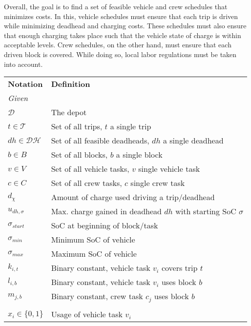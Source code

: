 \documentclass[]{article}
\begin{document}
Overall, the goal is to find a set of feasible vehicle and crew schedules that minimizes costs. In this, vehicle schedules must ensure that each trip is driven while minimizing deadhead and charging costs. These schedules must also ensure that enough charging takes place such that the vehicle state of charge is within acceptable levels. Crew schedules, on the other hand, must ensure that each driven block is covered. While doing so, local labor regulations must be taken into account.

\begin{table}[h]
  \centering
  \begin{tabular}{ll}
    \toprule
    \multicolumn{1}{l}{\textbf{Notation}} & \multicolumn{1}{l}{\textbf{Definition}}               \\
    \cmidrule(lr){1-1}\cmidrule(lr){2-2}
    \multicolumn{2}{l}{\textit{Given}} \\
    $\mathcal{D}$ & The depot \\ 
    $t \in \mathcal{T}$ & Set of all trips, $t$ a single trip \\
    $dh \in \mathcal{DH}$ & Set of all feasible deadheads, $dh$ a single deadhead \\ 
    $b \in B$ & Set of all blocks, $b$ a single block \\
    $v \in V$ & Set of all vehicle tasks, $v$ single vehicle task \\
    $c \in C$ & Set of all crew tasks, $c$ single crew task \\
    $d_\chi$ & Amount of charge used driving a trip/deadhead \\
    $u_{dh,\sigma}$ & Max. charge gained in deadhead $dh$ with starting SoC $\sigma$ \\
    $\sigma_{start}$ & SoC at beginning of block/task \\
    $\sigma_{min}$ & Minimum SoC of vehicle \\
    $\sigma_{max}$ & Maximum SoC of vehicle \\ 
    $k_{i,t}$ & Binary constant, vehicle task $v_i$ covers trip $t$ \\ 
    $l_{i,b}$ & Binary constant, vehicle task $v_i$ uses block $b$ \\ 
    $m_{j,b}$ & Binary constant, crew task $c_j$ uses block $b$ \\ 
    \addlinespace[0.6em]
    \multicolumn{2}{l}{\textit{Decision variables}} \\
    $x_{i} \in \{ 0, 1 \}$ & Usage of vehicle task $v_i$  \\ 

\end{tabular}
\end{table}
\end{document}
